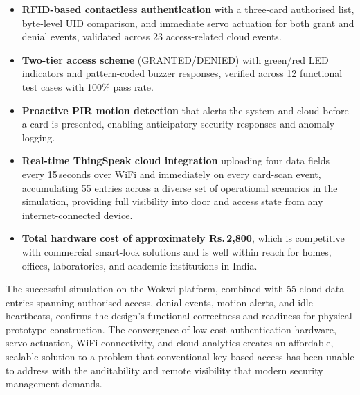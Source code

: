 \documentclass[12pt,a4paper]{article}
\begin{document}
\begin{itemize}[leftmargin=2em, itemsep=4pt]
  \item \textbf{RFID-based contactless authentication} with a
        three-card authorised list, byte-level UID comparison,
        and immediate servo actuation for both grant and denial
        events, validated across 23 access-related cloud events.
  \item \textbf{Two-tier access scheme} (GRANTED/DENIED) with
        green/red LED indicators and pattern-coded buzzer responses,
        verified across 12 functional test cases with 100\% pass rate.
  \item \textbf{Proactive PIR motion detection} that alerts the
        system and cloud before a card is presented, enabling
        anticipatory security responses and anomaly logging.
  \item \textbf{Real-time ThingSpeak cloud integration} uploading
        four data fields every 15\,seconds over WiFi and immediately
        on every card-scan event, accumulating 55 entries across
        a diverse set of operational scenarios in the simulation,
        providing full visibility into door and access state from
        any internet-connected device.
  \item \textbf{Total hardware cost of approximately Rs.\,2,800},
        which is competitive with commercial smart-lock solutions
        and is well within reach for homes, offices, laboratories,
        and academic institutions in India.
\end{itemize}

The successful simulation on the Wokwi platform, combined with
55 cloud data entries spanning authorised access, denial events,
motion alerts, and idle heartbeats, confirms the design's functional
correctness and readiness for physical prototype construction. The
convergence of low-cost authentication hardware, servo actuation,
WiFi connectivity, and cloud analytics creates an affordable,
scalable solution to a problem that conventional key-based access
has been unable to address with the auditability and remote
visibility that modern security management demands.
\end{document}
